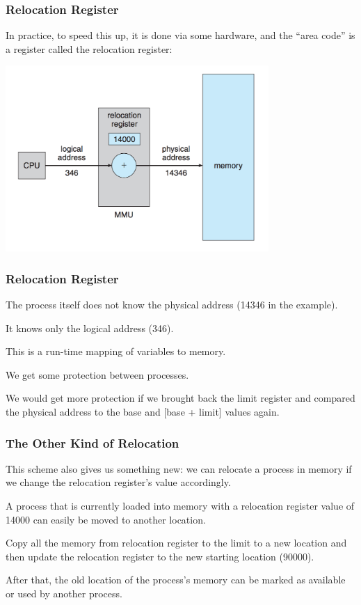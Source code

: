 \begin{frame}
\frametitle{Relocation Register}

In practice, to speed this up, it is done via some hardware, and the ``area code'' is a register called the \alert{relocation register}:

\begin{center}
\includegraphics[width=0.75\textwidth]{images/relocation-register.png}
\end{center}



\end{frame}

\begin{frame}
\frametitle{Relocation Register}

The process itself does not know the physical address (14346 in the example).

It knows only the logical address (346). 

This is a run-time mapping of variables to memory.  

We get some protection between processes.

We would get more protection if we brought back the limit register and compared the physical address to the base and [base + limit] values again. 


\end{frame}

\begin{frame}
\frametitle{The Other Kind of Relocation}

This scheme also gives us something new: we can relocate a process in memory if we change the relocation register's value accordingly. 

A process that is currently loaded into memory with a relocation register value of 14000 can easily be moved to another location. 

Copy all the memory from relocation register to the limit to a new location and then update the relocation register to the new starting location (90000). 

After that, the old location of the process's memory can be marked as available or used by another process.

\end{frame}

